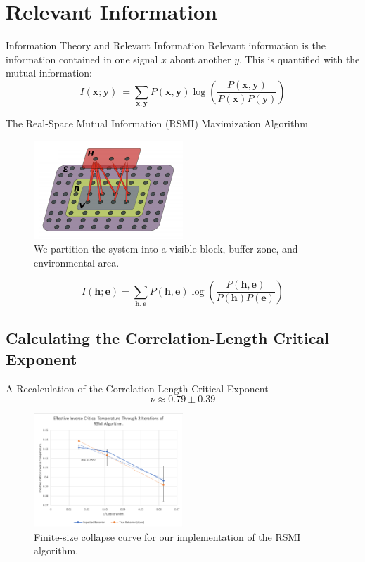 \documentclass{beamer}
\newcommand{\bolds}[1]{\boldsymbol{#1}}
\newcommand{\bh}{\bolds{h}}
\newcommand{\be}{\bolds{e}}
\newcommand{\bx}{\bolds{x}}
\newcommand{\by}{\bolds{y}}
\begin{document}
\section{Relevant Information}
\begin{frame}{Information Theory and Relevant Information}
  Relevant information is the information contained in one signal $x$
  about another $y$. This is quantified with the mutual information:%
  \begin{equation*}%
    \boxed{I(\bx; \by)\:=\sum_{\bx,\by}P(\bx,\by)\log\left(\frac{P(\bx,\by)}{P(\bx)P(\by)}\right)}
  \end{equation*}%
\end{frame}

\begin{frame}{The Real-Space Mutual Information (RSMI) Maximization Algorithm}
\begin{figure}[ht]
  \centering \includegraphics[width=0.5\textwidth]{figures/kjr.png}
  \caption{We partition the system into a visible block, buffer zone, and environmental area.\cite{kjr}}
\end{figure}%
\begin{equation*}%
  \boxed{I(\bh; \be)=\sum_{\bh,\be}P(\bh,\be)\log\left(\frac{P(\bh,\be)}{P(\bh)P(\be)}\right)}
\end{equation*}%
\end{frame}
\subsection{Calculating the Correlation-Length Critical Exponent}
\begin{frame}{A Recalculation of the Correlation-Length Critical Exponent}
\begin{equation*}%
  \boxed{\nu\approx 0.79 \pm0.39}
\end{equation*}%

\begin{figure}
  \centering
  \includegraphics[width=0.5\textwidth]{figures/crit-exponent.png}
  \caption{Finite-size collapse curve for our implementation of the RSMI algorithm.}
\end{figure}

\end{frame}
\end{document}
